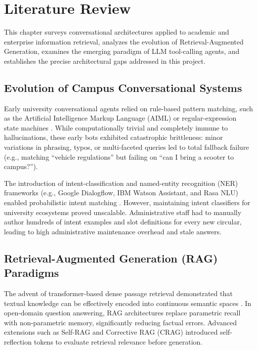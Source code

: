 \documentclass[12pt,a4paper]{report}
\begin{document}
\chapter{Literature Review}

This chapter surveys conversational architectures applied to academic and enterprise information retrieval, analyzes the evolution of Retrieval-Augmented Generation, examines the emerging paradigm of LLM tool-calling agents, and establishes the precise architectural gaps addressed in this project.

\section{Evolution of Campus Conversational Systems}
Early university conversational agents relied on rule-based pattern matching, such as the Artificial Intelligence Markup Language (AIML) or regular-expression state machines \cite{weizenbaum1966eliza, colace2018evaluating}. While computationally trivial and completely immune to hallucinations, these early bots exhibited catastrophic brittleness: minor variations in phrasing, typos, or multi-faceted queries led to total fallback failure (e.g., matching ``vehicle regulations'' but failing on ``can I bring a scooter to campus?'').

The introduction of intent-classification and named-entity recognition (NER) frameworks (e.g., Google Dialogflow, IBM Watson Assistant, and Rasa NLU) enabled probabilistic intent matching \cite{bocklisch2017rasa}. However, maintaining intent classifiers for university ecosystems proved unscalable. Administrative staff had to manually author hundreds of intent examples and slot definitions for every new circular, leading to high administrative maintenance overhead and stale answers.

\section{Retrieval-Augmented Generation (RAG) Paradigms}
The advent of transformer-based dense passage retrieval demonstrated that textual knowledge can be effectively encoded into continuous semantic spaces \cite{karpukhin2020dense, lewis2020retrieval}. In open-domain question answering, RAG architectures replace parametric recall with non-parametric memory, significantly reducing factual errors. Advanced extensions such as Self-RAG \cite{asai2023self} and Corrective RAG (CRAG) \cite{yan2024corrective} introduced self-reflection tokens to evaluate retrieval relevance before generation.
\end{document}
